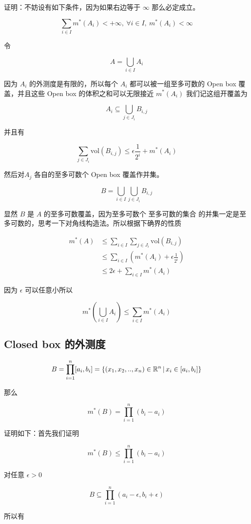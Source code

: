 证明：不妨设有如下条件，因为如果右边等于 $\infty$ 那么必定成立。

\[
\sum_{i \in I}m^*(A_i) < +\infty ,\: \forall i \in I,\: m^*(A_i) < \infty
\]


令

\[
A = \bigcup_{i \in I}A_i
\]

因为 $A_i$ 的外测度是有限的，所以每个 $A_i$ 都可以被一组至多可数的 Open box 覆盖，并且这些 Open box 的体积之和可以无限接近 $m^*(A_i)$
我们记这组开覆盖为

\[
A_i \subseteq \bigcup_{j \in J_i} B_{i, j}
\]

并且有

\[
\sum_{j \in J_i}\mathrm{vol}(B_{i, j}) \le  \epsilon \frac{1}{2^i} + m^*(A_i)
\]


然后对$A_j$ 各自的至多可数个 Open box 覆盖作并集。

\[
B = \bigcup_{i \in I} \bigcup_{j \in J_i} B_{i,j}
\]

显然 $B$ 是 $A$ 的至多可数覆盖，因为至多可数个 \: 至多可数的集合 \: 的并集一定是至多可数的，思考一下对角线构造法。所以根据下确界的性质

\begin{align*}
m^*(A) & \le \sum_{i \in I}\sum_{j \in J_i} \mathrm{vol}(B_{i, j})  \\
 & \le \sum_{i \in I}(m^*(A_i) + \epsilon \frac{1}{2^i}) \\
 & \le 2\epsilon + \sum_{i \in I}m^*(A_i)
\end{align*}

因为 $\epsilon$ 可以任意小所以

\[
m^*(\bigcup_{i \in I}A_i) \le \sum_{i \in I}m^*(A_i)
\]

\subsection{Closed box 的外测度}

\[
B = \prod_{i=1}^{n}[a_i, b_i] = \{ (x_1, x_2, .., x_n) \in \mathbb{R}^n \,\vert\, x_i \in [a_i, b_i] \}
\]

那么

\[
m^*(B) = \prod_{i=1}^{n}(b_i - a_i)
\]

证明如下：首先我们证明

\[
m^*(B) \le \prod_{i=1}^{n}(b_i - a_i)
\]

对任意 $\epsilon > 0$ 

\[
B \subseteq \prod_{i=1}^{n}(a_i - \epsilon, b_i + \epsilon)
\]

所以有

